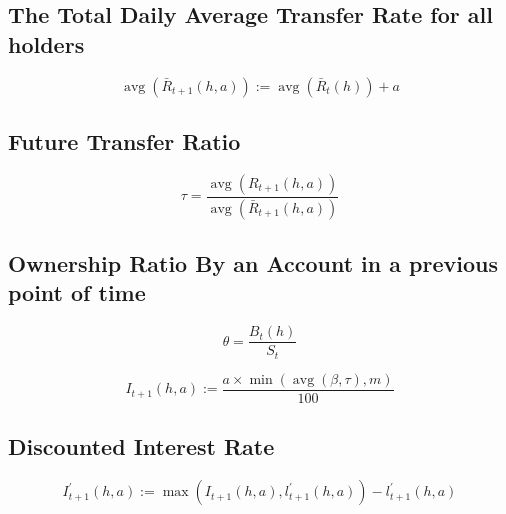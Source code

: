 \begin{tcolorbox}
\subsection{The Total Daily Average Transfer Rate for all holders }
\label{total.aggregate.daily.avg.transfer.rate}
\begin{equation}
\operatorname{avg}\left(\bar{R}_{t+1}(h, a)\right):=\operatorname{avg}\left(\bar{R}_{t}(h)\right)+a
\end{equation}
\end{tcolorbox}

\begin{tcolorbox}
\subsection{ Future Transfer Ratio }
\begin{equation}
\tau=\frac{\operatorname{avg}\left(R_{t+1}(h, a)\right)}{\operatorname{avg}\left(\bar{R}_{t+1}(h, a)\right)}
\end{equation}
\end{tcolorbox}

\begin{tcolorbox}
\subsection{ Ownership Ratio By an Account in a previous point of time }
\begin{equation}
\theta=\frac{B_{t}(h)}{S_{t}}
\end{equation}
\end{tcolorbox}

\begin{tcolorbox}
\label{Interest Rate}
\begin{equation}
I_{t+1}(h, a):=\frac{a \times \min (\operatorname{avg}(\beta, \tau), m)}{100}
\end{equation}
\end{tcolorbox}

\begin{tcolorbox}
\subsection{Discounted Interest Rate}
\label{Discounted Interest Rate}
\begin{equation}
I_{t+1}^{\prime}(h, a):=\max \left(I_{t+1}(h, a), l_{t+1}^{\prime}(h, a)\right)-l_{t+1}^{\prime}(h, a)
\end{equation}
\end{tcolorbox}


